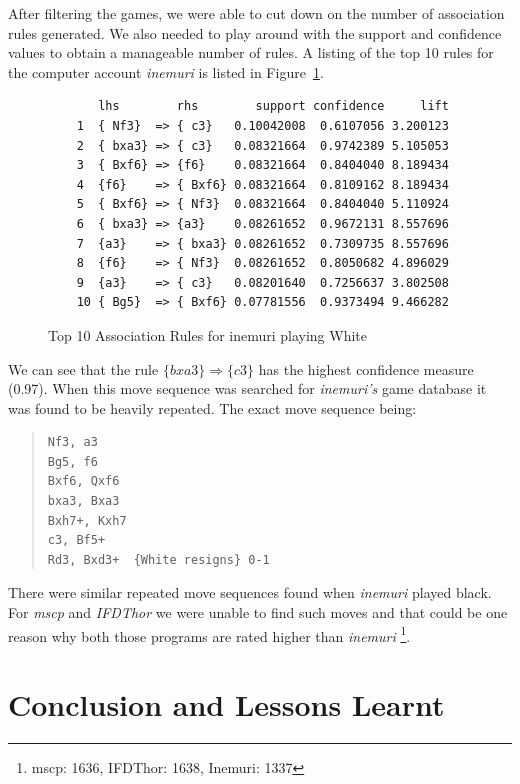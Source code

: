 \documentclass{article}
\begin{document}
After filtering the games, we were able to cut down on the number of association rules generated. We also needed to play around with the support and confidence values to obtain a manageable number of rules. A listing of the top 10 rules for the computer account {\sl inemuri} is listed in Figure~\ref{fig:inemuriwhite}.

\begin{figure}[htp]
\begin{verbatim}
       lhs        rhs        support confidence     lift
    1  { Nf3}  => { c3}   0.10042008  0.6107056 3.200123
    2  { bxa3} => { c3}   0.08321664  0.9742389 5.105053
    3  { Bxf6} => {f6}    0.08321664  0.8404040 8.189434
    4  {f6}    => { Bxf6} 0.08321664  0.8109162 8.189434
    5  { Bxf6} => { Nf3}  0.08321664  0.8404040 5.110924
    6  { bxa3} => {a3}    0.08261652  0.9672131 8.557696
    7  {a3}    => { bxa3} 0.08261652  0.7309735 8.557696
    8  {f6}    => { Nf3}  0.08261652  0.8050682 4.896029
    9  {a3}    => { c3}   0.08201640  0.7256637 3.802508
    10 { Bg5}  => { Bxf6} 0.07781556  0.9373494 9.466282
\end{verbatim}

\caption{Top 10 Association Rules for inemuri playing White}
\label{fig:inemuriwhite}
\end{figure}

We can see that the rule $\{bxa3\} \Rightarrow \{c3\}$ has the highest confidence measure (0.97). When this move sequence was searched for {\sl inemuri's} game database it was found to be heavily repeated. The exact move sequence being:

\begin{quote}
\begin{verbatim}
Nf3, a3 
Bg5, f6
Bxf6, Qxf6
bxa3, Bxa3
Bxh7+, Kxh7
c3, Bf5+
Rd3, Bxd3+  {White resigns} 0-1
\end{verbatim}
\end{quote}

There were similar repeated move sequences found when {\sl inemuri} played black. For {\sl mscp} and {\sl IFDThor} we were unable to find such moves and that could be one reason why both those programs are rated higher than {\sl inemuri} \footnote{mscp: 1636, IFDThor: 1638, Inemuri: 1337}.

\section{Conclusion and Lessons Learnt}
\end{document}
